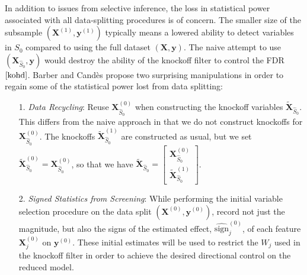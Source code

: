 \documentclass[]{scrartcl}
\newcommand{\1}[1]{\mathbbm{1}_{\left\{#1\right\}}}
\begin{document}
\noindent
In addition to issues from selective inference, the loss in statistical power associated with all data-splitting procedures is of concern. The smaller size of the subsample $(\mathbf{\mathbf{X}}^{(1)}, \mathbf{y}^{(1)})$ typically means a lowered ability to detect variables in $S_{0}$ compared to using the full dataset $(\mathbf{\mathbf{X}}, \mathbf{y})$. The naive attempt to use $(\mathbf{\mathbf{X}}_{\widehat{S}_{0}}, \mathbf{y})$ would destroy the ability of the knockoff filter to control the FDR $\cite{kohd}$. Barber and Cand\`es propose two surprising manipulations in order to regain some of the statistical power lost from data splitting:
\begin{itemize}
	\item[1.]\textit{Data Recycling}: Reuse $\mathbf{\mathbf{X}}_{\widehat{S}_{0}}^{(0)}$ when constructing the knockoff variables $\widetilde{\mathbf{\mathbf{X}}}_{\widehat{S}_{0}}$. This differs from the naive approach in that we do not construct knockoffs for $\mathbf{X}_{\widehat{S}_{0}}^{(0)}$. The knockoffs $\widetilde{\mathbf{X}}_{\widehat{S}_{0}}^{(1)}$ are constructed as usual, but we set $\widetilde{\mathbf{X}}_{\widehat{S}_{0}}^{(0)} = \mathbf{X}_{\widehat{S}_{0}}^{(0)}$, so that we have $\widetilde{\mathbf{X}}_{\widehat{S}_{0}} = \begin{bmatrix}
	\mathbf{X}_{\widehat{S}_{0}}^{(0)}\\ \widetilde{\mathbf{X}}_{\widehat{S}_{0}}^{(1)}
	\end{bmatrix}$.  
	\item[2.]\textit{Signed Statistics from Screening}: While performing the initial variable selection procedure on the data split $(\mathbf{\mathbf{X}}^{(0)}, \mathbf{y}^{(0)})$, record not just the magnitude, but also the signs of the estimated effect, $\widehat{\text{sign}}^{(0)}_{j}$, of each feature $\mathbf{\mathbf{X}}^{(0)}_{j}$ on $\mathbf{y}^{(0)}$. These initial estimates will be used to restrict the $W_{j}$ used in the knockoff filter in order to achieve the desired directional control on the reduced model.
\end{itemize}
\end{document}
